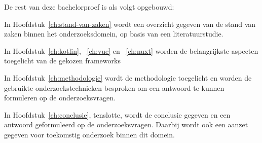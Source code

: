 
De rest van deze bachelorproef is als volgt opgebouwd:

In Hoofdstuk~\ref{ch:stand-van-zaken} wordt een overzicht gegeven van de stand van zaken binnen het onderzoeksdomein, op basis van een literatuurstudie.

In Hoofdstuk~\ref{ch:kotlin}, ~\ref{ch:vue} en ~\ref{ch:nuxt} worden de belangrijkste aspecten toegelicht van de gekozen frameworks

In Hoofdstuk~\ref{ch:methodologie} wordt de methodologie toegelicht en worden de gebruikte onderzoekstechnieken besproken om een antwoord te kunnen formuleren op de onderzoeksvragen.

In Hoofdstuk~\ref{ch:conclusie}, tenslotte, wordt de conclusie gegeven en een antwoord geformuleerd op de onderzoeksvragen. Daarbij wordt ook een aanzet gegeven voor toekomstig onderzoek binnen dit domein.